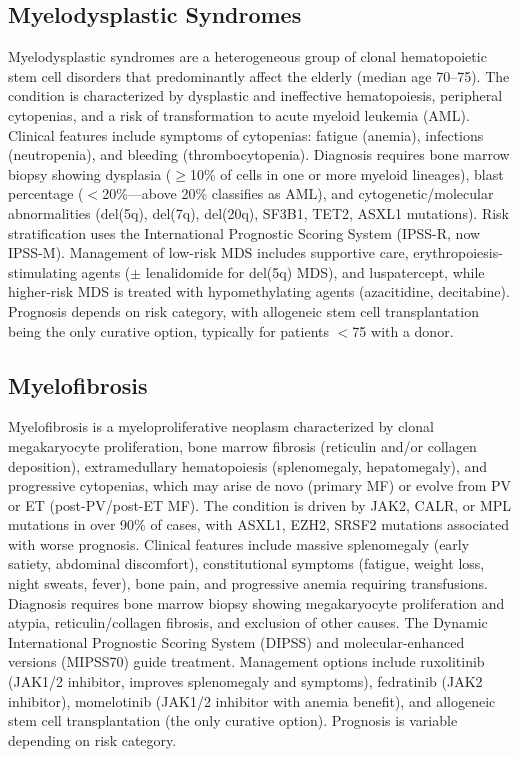 \subsection{Myelodysplastic Syndromes}
\label{sec:Myelodysplastic Syndromes}
Myelodysplastic syndromes are a heterogeneous group of clonal hematopoietic stem cell disorders that predominantly affect the elderly (median age 70--75). The condition is characterized by dysplastic and ineffective hematopoiesis, peripheral cytopenias, and a risk of transformation to acute myeloid leukemia (AML). Clinical features include symptoms of cytopenias: fatigue (anemia), infections (neutropenia), and bleeding (thrombocytopenia). Diagnosis requires bone marrow biopsy showing dysplasia ($\geq$10\% of cells in one or more myeloid lineages), blast percentage ($<$20\%---above 20\% classifies as AML), and cytogenetic/molecular abnormalities (del(5q), del(7q), del(20q), SF3B1, TET2, ASXL1 mutations). Risk stratification uses the International Prognostic Scoring System (IPSS-R, now IPSS-M). Management of low-risk MDS includes supportive care, erythropoiesis-stimulating agents ($\pm$ lenalidomide for del(5q) MDS), and luspatercept, while higher-risk MDS is treated with hypomethylating agents (azacitidine, decitabine). Prognosis depends on risk category, with allogeneic stem cell transplantation being the only curative option, typically for patients $<$75 with a donor.

\subsection{Myelofibrosis}
\label{sec:Myelofibrosis}
Myelofibrosis is a myeloproliferative neoplasm characterized by clonal megakaryocyte proliferation, bone marrow fibrosis (reticulin and/or collagen deposition), extramedullary hematopoiesis (splenomegaly, hepatomegaly), and progressive cytopenias, which may arise de novo (primary MF) or evolve from PV or ET (post-PV/post-ET MF). The condition is driven by JAK2, CALR, or MPL mutations in over 90\% of cases, with ASXL1, EZH2, SRSF2 mutations associated with worse prognosis. Clinical features include massive splenomegaly (early satiety, abdominal discomfort), constitutional symptoms (fatigue, weight loss, night sweats, fever), bone pain, and progressive anemia requiring transfusions. Diagnosis requires bone marrow biopsy showing megakaryocyte proliferation and atypia, reticulin/collagen fibrosis, and exclusion of other causes. The Dynamic International Prognostic Scoring System (DIPSS) and molecular-enhanced versions (MIPSS70) guide treatment. Management options include ruxolitinib (JAK1/2 inhibitor, improves splenomegaly and symptoms), fedratinib (JAK2 inhibitor), momelotinib (JAK1/2 inhibitor with anemia benefit), and allogeneic stem cell transplantation (the only curative option). Prognosis is variable depending on risk category.

